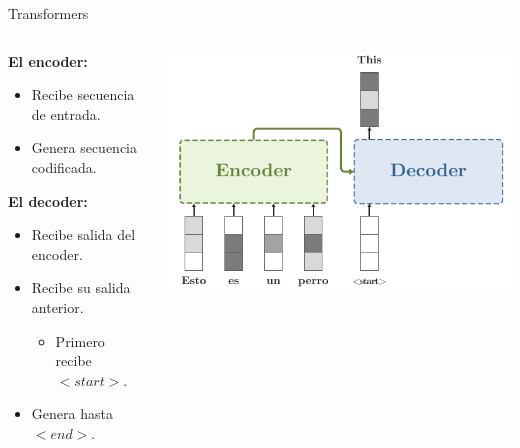 \documentclass[aspectratio=169]{beamer}
\begin{document}
\begin{frame}{Transformers}
  \begin{columns}
    \begin{column}{.4\textwidth}
      \textbf{El encoder:}
      \begin{itemize}
        \item Recibe secuencia de entrada.
        \item Genera secuencia codificada.
      \end{itemize}
      \vspace{.5cm}
      \textbf{El decoder:}
      \begin{itemize}
        \item Recibe salida del encoder.
        \item Recibe su salida anterior.
        \begin{itemize}
          \item Primero recibe \emph{$<start>$}.
        \end{itemize}
        \item Genera hasta \emph{$<end>$}.
      \end{itemize}
    \end{column}
    \begin{column}{.6\textwidth}
      \includegraphics[width=\textwidth, center]{imgs/tema4/att/Transformer_all_s1.pdf}
    \end{column}
  \end{columns}
\end{frame}
\end{document}
